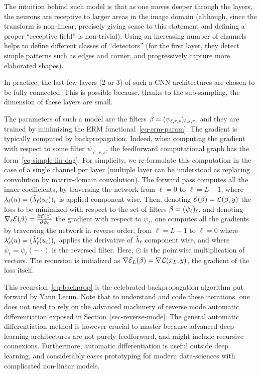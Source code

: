 The intuition behind such model is that as one moves deeper through the layers, the neurons are receptive to larger areas in the image domain (although, since the transform is non-linear, precisely giving sense to this statement and defining a proper ``receptive field'' is non-trivial). Using an increasing number of channels helps to define different classes of ``detectors'' (for the first layer, they detect simple patterns such as edges and corner, and progressively capture more elaborated shapes).

In practice, the last few layers (2 or 3) of such a CNN architectures are chosen to be fully connected. This is possible because, thanks to the sub-sampling, the dimension of these layers are small.  

The parameters of such a model are the filters $\beta = (\psi_{\ell,r,s})_{\ell,s,r}$, and they are trained by minimizing the ERM functional~\eqref{eq-erm-param}. The gradient is typically computed by backpropagation. Indeed, when computing the gradient with respect to some filter $\psi_{\ell,r,s}$, the feedforward computational graph has the form~\eqref{eq-simple-lin-dag}. For simplicity, we re-formulate this computation in the case of a single channel per layer (multiple layer can be understood as replacing convolution by matrix-domain convolution). The forward pass computes all the inner coefficients, by traversing the network from $\ell=0$ to $\ell=L-1$, 
where $\lambda_\ell(u)=(\tilde{\lambda}_\ell(u_i))_i$ is applied component wise. Then, denoting $\mathcal{E}(\beta) = \mathcal{L}( \beta,y )$ the loss to be minimized with respect to the set of filters $\beta=(\psi_\ell)_\ell$, and denoting $\nabla_\ell \mathcal{E}(\beta) = \frac{ \partial \mathcal{E}( \beta )}{\partial \psi_\ell}$ the gradient with respect to $\psi_\ell$, one computes all the gradients by traversing the network in reverse order, from $\ell=L-1$ to $\ell=0$
where $\lambda_\ell'(u)=( \tilde{\lambda}_\ell'( u_i ) )_i$ applies the derivative of $\tilde{\lambda}_\ell$ component wise, and where $\bar \psi_{\ell} = \psi_\ell(-\cdot)$ is the reversed filter. Here, $\odot$ is the pointwise multiplication of vectors.
%
The recursion is initialized as $\nabla \mathcal{E}_L(\beta) = \nabla \mathcal{L}(x_L,y)$, the gradient of the loss itself. 

This recursion~\eqref{eq-backprop} is the celebrated backpropagation algorithm put forward by Yann Lecun. Note that to understand and code these iterations, one does not need to rely on the advanced machinery of reverse mode automatic differentiation exposed in Section~\ref{sec-reverse-mode}. The general automatic differentiation method is however crucial to master because advanced deep-learning architectures are not purely feedforward, and might include recursive connexions. Furthermore, automatic differentiation is useful outside deep learning, and considerably eases prototyping for modern data-sciences with complicated non-linear models.  

